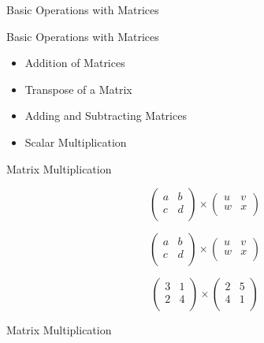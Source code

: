 {
	{Basic Operations with Matrices  }
{
	{Basic Operations with Matrices }
	
	\begin{itemize}
		\item Addition of Matrices
		\item Transpose of a Matrix
		\item Adding and Subtracting Matrices
		\item Scalar Multiplication
	\end{itemize}
}

{
	
	{Matrix Multiplication}
	{
		
		\[ \left(
		\begin{array}{cc}
		a & b \\
		c & d \\
		\end{array}
		\right) \times \left(
		\begin{array}{cc}
		u & v \\
		w & x \\
		\end{array}
		\right)
		\]
		
		
		
		\[ \left(
		\begin{array}{cc}
		a & b \\
		c & d \\
		\end{array}
		\right) \times \left(
		\begin{array}{cc}
		u & v \\
		w & x \\
		\end{array}
		\right)
		\]
		
		
		
		\[ \left(
		\begin{array}{cc}
		3 & 1 \\
		2 & 4 \\
		\end{array}
		\right) \times \left(
		\begin{array}{cc}
		2 & 5 \\
		4 & 1 \\
		\end{array}
		\right)
		\]
		
		{Matrix Multiplication}
		
		{\huge
			
}}}}
